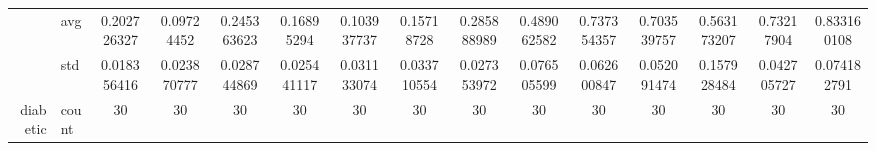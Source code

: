 \begin{table}[H]
{\begin{tabular}{rlccc|c|c|c|c|c|ccccc}
			                                                                               & avg                & \cellcolor[rgb]{ .729,  .843,  .502}0.202726327                                & \cellcolor[rgb]{ .388,  .745,  .482}\textcolor[rgb]{ 0,  .38,  0}{0.09724452}  & \cellcolor[rgb]{ .867,  .882,  .51}0.245363623                                 & \cellcolor[rgb]{ .62,  .812,  .494}0.16895294   & \cellcolor[rgb]{ .408,  .749,  .482}0.103937737                                & \cellcolor[rgb]{ .58,  .8,  .49}0.15718728      & \cellcolor[rgb]{ 1,  .922,  .518}0.285888989                                   & \cellcolor[rgb]{ .992,  .733,  .482}0.489062582 & \cellcolor[rgb]{ .98,  .502,  .439}0.737354357  & \cellcolor[rgb]{ .98,  .533,  .443}0.703539757  & \cellcolor[rgb]{ .988,  .667,  .471}0.563173207 & \cellcolor[rgb]{ .98,  .506,  .439}0.73217904   & \cellcolor[rgb]{ .973,  .412,  .42}0.833160108  \\
			                                                                               & std                & 0.018356416                                                                    & 0.023870777                                                                    & 0.028744869                                                                    & 0.025441117                                     & 0.031133074                                                                    & 0.033710554                                     & 0.027353972                                                                    & 0.076505599                                     & 0.062600847                                     & 0.052091474                                     & 0.157928484                                     & 0.042705727                                     & 0.074182791                                     \\
			diabetic                                                                       & count              & 30                                                                             & 30                                                                             & 30                                                                             & 30                                              & 30                                                                             & 30                                              & 30                                                                             & 30                                              & 30                                              & 30                                              & 30                                              & 30                                              & 30                                              \\

\end{tabular}}
\end{table}
